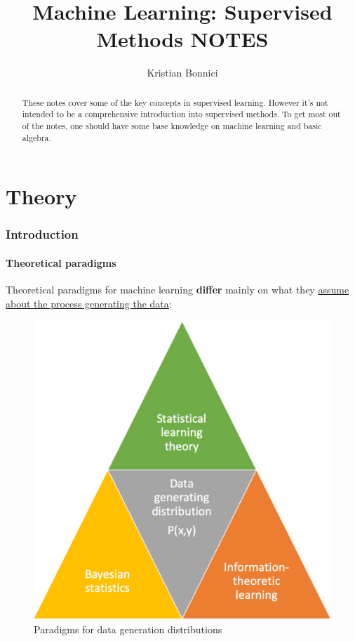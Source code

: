 \documentclass[12pt, a4paper]{article}
\title{Machine Learning: Supervised Methods NOTES}
\author{Kristian Bonnici}
\let\stdsection\section
\renewcommand\section{\newpage\stdsection} %
\begin{document}
\maketitle
\tableofcontents

\begin{abstract}
These notes cover some of the key concepts in supervised learning. However it's not intended to be a comprehensive introduction into supervised methods. To get most out of the notes, one should have some base knowledge on machine learning and basic algebra.
\end{abstract}

\printnomenclature\label{summary-of-notation}





\newpage
\part{Theory}
\newpage

\section{Introduction}\label{introduction}

\subsection{Theoretical paradigms }\label{theoretical-paradigms}

Theoretical paradigms for machine learning \textbf{differ} mainly on
what they \uline{assume about the process generating the data}:

\begin{figure}[H]
  \centering  %
    \includegraphics[width=0.4\columnwidth]{images/theoretical-paradigms.png}
    \caption{Paradigms for data generation distributions}
    \label{fig:fig1}
\end{figure}
\end{document}
